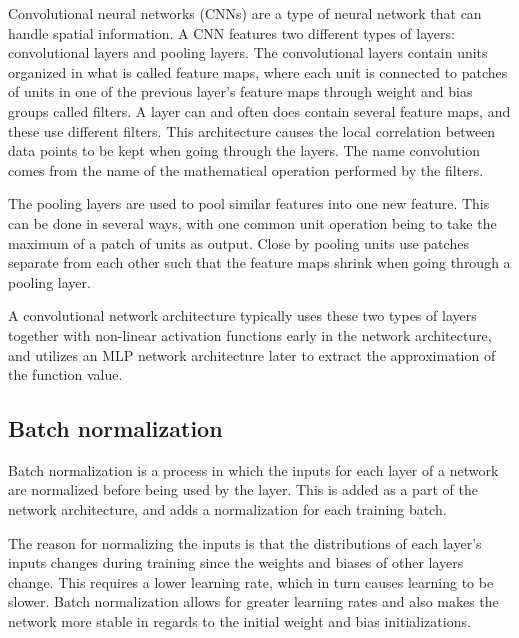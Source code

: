 \documentclass{kththesis}
\begin{document}
Convolutional neural networks (CNNs) are a type of neural network that can handle spatial information. A CNN features two different types of layers: convolutional layers and pooling layers. The convolutional layers contain units organized in what is called feature maps, where each unit is connected to patches of units in one of the previous layer's feature maps through weight and bias groups called filters. A layer can and often does contain several feature maps, and these use different filters. This architecture causes the local correlation between data points to be kept when going through the layers. The name convolution comes from the name of the mathematical operation performed by the filters. \parencite{lecun2015deep}

The pooling layers are used to pool similar features into one new feature. This can be done in several ways, with one common unit operation being to take the maximum of a patch of units as output. Close by pooling units use patches separate from each other such that the feature maps shrink when going through a pooling layer. \parencite{lecun2015deep}

A convolutional network architecture typically uses these two types of layers together with non-linear activation functions early in the network architecture, and utilizes an MLP network architecture later to extract the approximation of the function value. \parencite{lecun2015deep}

\subsection{Batch normalization}
Batch normalization is a process in which the inputs for each layer of a network are normalized before being used by the layer. This is added as a part of the network architecture, and adds a normalization for each training batch.

The reason for normalizing the inputs is that the distributions of each layer's inputs changes during training since the weights and biases of other layers change. This requires a lower learning rate, which in turn causes learning to be slower. Batch normalization allows for greater learning rates and also makes the network more stable in regards to the initial weight and bias initializations. \parencite{ioffe2015batch}
\end{document}
